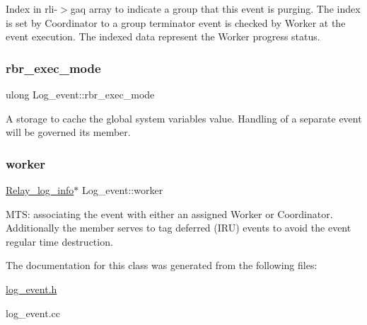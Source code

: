 Index in {\ttfamily rli-\/$>$gaq} array to indicate a group that this event is purging. The index is set by Coordinator to a group terminator event is checked by Worker at the event execution. The indexed data represent the Worker progress status. \mbox{\label{classLog__event_a92b745a1eabd89fb67b1f7c4d626d689}} 
\subsubsection{\texorpdfstring{rbr\+\_\+exec\+\_\+mode}{rbr\_exec\_mode}}
{\footnotesize\ttfamily ulong Log\+\_\+event\+::rbr\+\_\+exec\+\_\+mode}

A storage to cache the global system variable\textquotesingle{}s value. Handling of a separate event will be governed its member. \mbox{\label{classLog__event_a8a1eeab37171617a328e2f62d7130def}} 
\subsubsection{\texorpdfstring{worker}{worker}}
{\footnotesize\ttfamily \mbox{\hyperlink{classRelay__log__info}{Relay\+\_\+log\+\_\+info}}$\ast$ Log\+\_\+event\+::worker}

M\+TS\+: associating the event with either an assigned Worker or Coordinator. Additionally the member serves to tag deferred (I\+RU) events to avoid the event regular time destruction. 

The documentation for this class was generated from the following files\+:\begin{DoxyCompactItemize}
\item 
\mbox{\hyperlink{log__event_8h}{log\+\_\+event.\+h}}\item 
log\+\_\+event.\+cc\end{DoxyCompactItemize}
